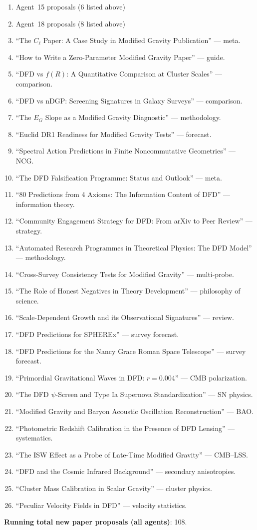 \documentclass[11pt,a4paper]{article}
\begin{document}
\begin{enumerate}
\item Agent~15 proposals (6 listed above)
\item Agent~18 proposals (8 listed above)
\item ``The $C_\ell$ Paper: A Case Study in Modified Gravity Publication'' --- meta.
\item ``How to Write a Zero-Parameter Modified Gravity Paper'' --- guide.
\item ``DFD vs $f(R)$: A Quantitative Comparison at Cluster Scales'' --- comparison.
\item ``DFD vs nDGP: Screening Signatures in Galaxy Surveys'' --- comparison.
\item ``The $E_G$ Slope as a Modified Gravity Diagnostic'' --- methodology.
\item ``Euclid DR1 Readiness for Modified Gravity Tests'' --- forecast.
\item ``Spectral Action Predictions in Finite Noncommutative Geometries'' --- NCG.
\item ``The DFD Falsification Programme: Status and Outlook'' --- meta.
\item ``80 Predictions from 4 Axioms: The Information Content of DFD'' --- information theory.
\item ``Community Engagement Strategy for DFD: From arXiv to Peer Review'' --- strategy.
\item ``Automated Research Programmes in Theoretical Physics: The DFD Model'' --- methodology.
\item ``Cross-Survey Consistency Tests for Modified Gravity'' --- multi-probe.
\item ``The Role of Honest Negatives in Theory Development'' --- philosophy of science.
\item ``Scale-Dependent Growth and its Observational Signatures'' --- review.
\item ``DFD Predictions for SPHEREx'' --- survey forecast.
\item ``DFD Predictions for the Nancy Grace Roman Space Telescope'' --- survey forecast.
\item ``Primordial Gravitational Waves in DFD: $r = 0.004$'' --- CMB polarization.
\item ``The DFD $\psi$-Screen and Type Ia Supernova Standardization'' --- SN physics.
\item ``Modified Gravity and Baryon Acoustic Oscillation Reconstruction'' --- BAO.
\item ``Photometric Redshift Calibration in the Presence of DFD Lensing'' --- systematics.
\item ``The ISW Effect as a Probe of Late-Time Modified Gravity'' --- CMB--LSS.
\item ``DFD and the Cosmic Infrared Background'' --- secondary anisotropies.
\item ``Cluster Mass Calibration in Scalar Gravity'' --- cluster physics.
\item ``Peculiar Velocity Fields in DFD'' --- velocity statistics.
\end{enumerate}

\textbf{Running total new paper proposals (all agents)}: 108.
\end{document}
